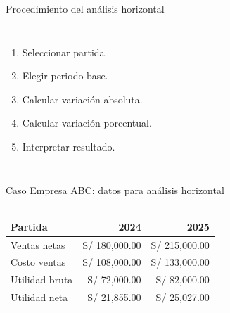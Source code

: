 \begin{frame}{Procedimiento del análisis horizontal}
  \begin{columns}[T,onlytextwidth]
    \begin{enumerate}
      \item Seleccionar partida.
      \item Elegir periodo base.
      \item Calcular variación absoluta.
      \item Calcular variación porcentual.
      \item Interpretar resultado.
    \end{enumerate}
  \end{columns}
\end{frame}

\begin{frame}{Caso Empresa ABC: datos para análisis horizontal}
  \begin{columns}[T,onlytextwidth]
    \scriptsize
    \begin{tabular}{lrr}
      \toprule
      Partida & 2024 & 2025 \\
      \midrule
      Ventas netas & S/ 180,000.00 & S/ 215,000.00 \\
      Costo ventas & S/ 108,000.00 & S/ 133,000.00 \\
      Utilidad bruta & S/ 72,000.00 & S/ 82,000.00 \\
      Utilidad neta & S/ 21,855.00 & S/ 25,027.00 \\
      \bottomrule
    \end{tabular}
  \end{columns}
\end{frame}

